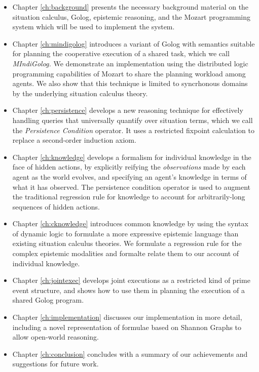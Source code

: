 \begin{itemize}
\item Chapter \ref{ch:background} presents the necessary background material
on the situation calculus, Golog, epistemic reasoning, and the Mozart
programming system which will be used to implement the system. 
\item Chapter \ref{ch:mindigolog} introduces a variant of Golog with semantics
suitable for planning the cooperative execution of a shared task,
which we call \emph{MIndiGolog.} We demonstrate an implementation
using the distributed logic programming capabilities of Mozart to
share the planning workload among agents. We also show that this technique
is limited to syncrhonous domains by the underlying situation calculus
theory. 
\item Chapter \ref{ch:persistence} develops a new reasoning technique for
effectively handling queries that universally quantify over situation
terms, which we call the \emph{Persistence Condition} operator. It
uses a restricted fixpoint calculation to replace a second-order induction
axiom. 
\item Chapter \ref{ch:knowledge} develops a formalism for individual knowledge
in the face of hidden actions, by explicitly reifying the \emph{observations}
made by each agent as the world evolves, and specifying an agent's
knowledge in terms of what it has observed. The persistence condition
operator is used to augment the traditional regression rule for knowledge
to account for arbitrarily-long sequences of hidden actions. 
\item Chapter \ref{ch:cknowledge} introduces common knowledge by using
the syntax of dynamic logic to formulate a more expressive epistemic
language than existing situation calculus theories. We formulate a
regression rule for the complex epistemic modalities and formalte
relate them to our account of individual knowledge. 
\item Chapter \ref{ch:jointexec} develops joint executions as a restricted
kind of prime event structure, and shows how to use them in planning
the execution of a shared Golog program. 
\item Chapter \ref{ch:implementation} discusses our implementation in more
detail, including a novel representation of formulae based on Shannon
Graphs to allow open-world reasoning. 
\item Chapter \ref{ch:conclusion} concludes with a summary of our achievements
and suggestions for future work. 
\end{itemize}
